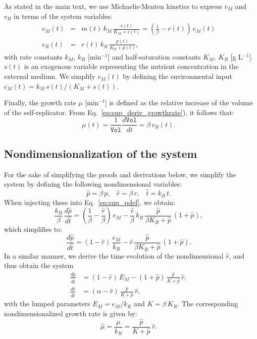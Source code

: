 As stated in the main text, we use Michaelis-Menten kinetics to express $v_M$ and $v_R$ in terms of the system variables:
\begin{eqnarray}
v_M(t) &=& m(t) \, k_M \, \frac{s(t)}{K_M +s(t)} = \left(\frac{1}{\beta} - r(t)\right)\, e_M(t) \nonumber \\
v_R(t) &=& r(t) \, k_R \, \frac{p(t)}{K_R +p(t)}, \nonumber 
\end{eqnarray}
with rate constants $k_M$, $k_R$ [min$^{-1}$] and half-saturation constants $K_M$, $K_R$ [g L$^{-1}$].
$s(t)$ is an exogenous variable representing the nutrient concentration in the external medium.
We simplify $v_M(t)$ by defining the environmental input $e_M(t) = k_M \, s(t) / (K_M + s(t))$.

Finally, the growth rate $\mu$ [min$^{-1}$] is defined as the relative increase of the volume of the self-replicator.
From Eq.~\ref{eq:sup_deriv_growthrate}), it follows that:
\begin{equation}
\label{eq:sup_growthrate}
\mu (t) = \frac{1}{\texttt{Vol}} \frac{d\texttt{Vol}}{dt} = \beta\, v_R(t).
\end{equation}

\subsection{Nondimensionalization of the system}

For the sake of simplifying the proofs and derivations below, we simplify the system by defining the following nondimensional variables:
\begin{equation*}
\hat{p}  = \beta \, p,\;\;\;
\hat{r}  = \beta \, r,\;\;\;
\hat{t}  = k_R \, t.
\end{equation*}
When injecting these into Eq.~\ref{eq:sup_pdef}, we obtain:
\[
\frac{k_R}{\beta} \, \frac{d\hat{p}}{d\hat{t}} = \left( \frac{1}{\beta} - \frac{\hat{r}}{\beta} \right) \, e_M - \frac{\hat{r}}{\beta} \, k_R \, \frac{\hat{p}}{\beta K_R + \hat{p}} \, (1 + \hat{p}),
\]
which simplifies to:
\[
\frac{d\hat{p}}{d\hat{t}} = ( 1 - \hat{r} ) \, \frac{e_M}{k_R} - \hat{r} \, \frac{\hat{p}}{\beta K_R + \hat{p}} \, (1 + \hat{p}).
\]
In a similar manner, we derive the time evolution of the nondimensional $\hat{r}$, and thus obtain the system
\begin{equation}
\label{eq:sup_adim}
\begin{aligned}
\frac{d\hat{p}}{d\hat{t}} &= (1-\hat{r})\, E_M - (1 + \hat{p}) \, \frac{\hat{p}}{K + \hat{p}}\, \hat{r},\\
\frac{d\hat{r}}{d\hat{t}} &= (\alpha - \hat{r}) \, \frac{\hat{p}}{K + \hat{p}}\, \hat{r},
\end{aligned}
\end{equation}
with the lumped parameters $E_M = e_M / k_R$ and $K = \beta \, K_R$.
The corresponding nondimensionalized growth rate is given by:
\begin{equation}
\label{eq:sup_growthrate_adim}
\hat{\mu} = \frac{\mu}{k_R} = \frac{\hat{p}}{K+\hat{p}} \, \hat{r}.
\end{equation}

